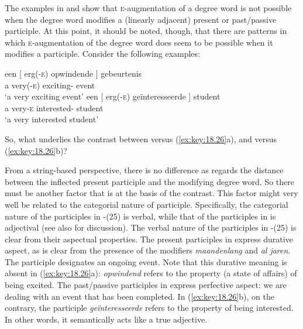 \documentclass[output=paper]{langsci/langscibook}
\begin{document}
The examples in  and  show that
\textsc{e}-augmentation of a degree word is not possible when the degree word
modifies a (linearly adjacent) present or past/passive participle. At this
point, it should be noted, though, that there are patterns in which
\textsc{e}-augmentation of the degree word does seem to be possible when it
modifies a participle. Consider the following examples:

\ea%
    \label{ex:key:18.26}
	\ea
	\gll een [ erg(\textsc{-e})    opwindende ]    gebeurtenis\\
        a {} very(-\textsc{e})    exciting-\Agr{} {} event\\
	\glt \enquote*{a very exciting event}
	\ex
	\gll een [ erg(-\textsc{e})  geïnteresseerde ]    student\\
        a {}   very-\textsc{e}      interested-\Agr{} {}     student\\
	\glt \enquote*{a very interested student}
	\z
\z

So, what underlies the contrast between  versus
(\ref{ex:key:18.26}a), and  versus (\ref{ex:key:18.26}b)?

From a string-based perspective, there is no difference as regards the distance
between the inflected present participle and the modifying degree word. So
there must be another factor that is at the basis of the contrast. This factor
might very well be related to the categorial nature of participle.
Specifically, the categorial nature of the participles in -(25)
is verbal, while that of the participles in  is adjectival (see
also \citealt{Broekhuis2013} for discussion). The verbal nature of the
participles in -(25) is clear from their aspectual properties.
The present participles in  express durative aspect, as is clear
from the presence of the modifiers \emph{maandenlang} and \emph{al jaren}. The
participle designates an ongoing event. Note that this durative meaning is
absent in (\ref{ex:key:18.26}a): \emph{opwindend} refers to the property (a state of
affairs) of being excited. The past/passive participles in 
express perfective aspect: we are dealing with an event that has been
completed. In (\ref{ex:key:18.26}b), on the contrary, the participle
\emph{geïnteresseerde} refers to the property of being interested. In other
words, it semantically acts like a true adjective.
\end{document}
